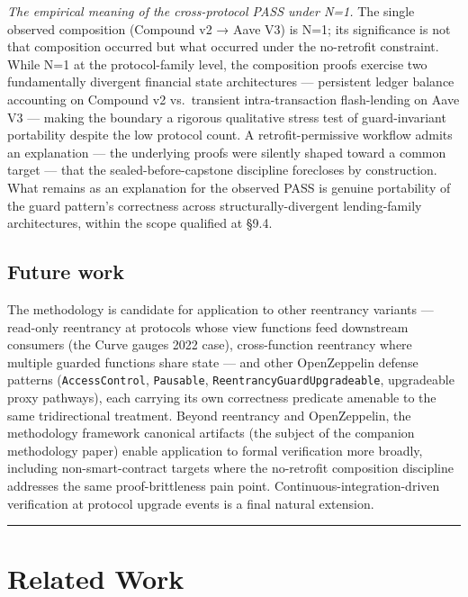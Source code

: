 \emph{The empirical meaning of the cross-protocol PASS under N=1.} The
single observed composition (Compound v2 → Aave V3) is N=1; its
significance is not that composition occurred but what occurred under
the no-retrofit constraint. While N=1 at the protocol-family level, the
composition proofs exercise two fundamentally divergent financial state
architectures --- persistent ledger balance accounting on Compound v2
vs.~transient intra-transaction flash-lending on Aave V3 --- making the
boundary a rigorous qualitative stress test of guard-invariant
portability despite the low protocol count. A retrofit-permissive
workflow admits an explanation --- the underlying proofs were silently
shaped toward a common target --- that the sealed-before-capstone
discipline forecloses by construction. What remains as an explanation
for the observed PASS is genuine portability of the guard pattern's
correctness across structurally-divergent lending-family architectures,
within the scope qualified at §9.4.

\subsection{Future work}\label{future-work}

The methodology is candidate for application to other reentrancy
variants --- read-only reentrancy at protocols whose view functions feed
downstream consumers (the Curve gauges 2022 case), cross-function
reentrancy where multiple guarded functions share state --- and other
OpenZeppelin defense patterns (\texttt{AccessControl},
\texttt{Pausable}, \texttt{ReentrancyGuardUpgradeable}, upgradeable
proxy pathways), each carrying its own correctness predicate amenable to
the same tridirectional treatment. Beyond reentrancy and OpenZeppelin,
the methodology framework canonical artifacts (the subject of the
companion methodology paper) enable application to formal verification
more broadly, including non-smart-contract targets where the no-retrofit
composition discipline addresses the same proof-brittleness pain point.
Continuous-integration-driven verification at protocol upgrade events is
a final natural extension.

\begin{center}\rule{0.5\linewidth}{0.5pt}\end{center}

\section{Related Work}\label{related-work}

